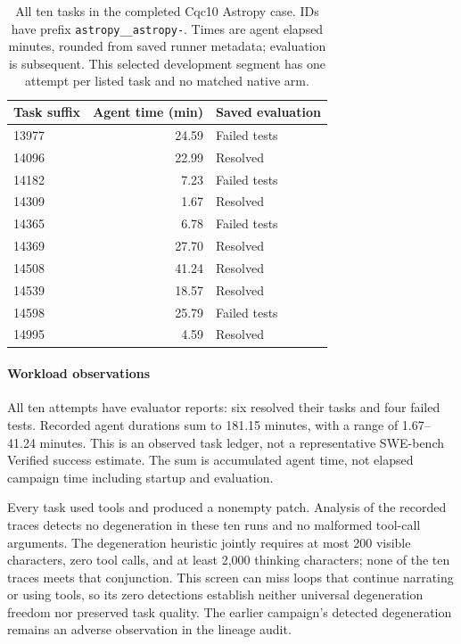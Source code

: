 \begin{table}[t]
\caption{All ten tasks in the completed Cqc10 Astropy case. IDs have prefix \texttt{astropy\_\_astropy-}. Times are agent elapsed minutes, rounded from saved runner metadata; evaluation is subsequent. This selected development segment has one attempt per listed task and no matched native arm.}
\label{tab:swe-tasks}
\centering\small
\begin{tabular}{@{}lrl@{}}
\toprule
Task suffix & Agent time (min) & Saved evaluation \\
\midrule
13977 & 24.59 & Failed tests \\
14096 & 22.99 & Resolved \\
14182 & 7.23 & Failed tests \\
14309 & 1.67 & Resolved \\
14365 & 6.78 & Failed tests \\
14369 & 27.70 & Resolved \\
14508 & 41.24 & Resolved \\
14539 & 18.57 & Resolved \\
14598 & 25.79 & Failed tests \\
14995 & 4.59 & Resolved \\
\bottomrule
\end{tabular}
\end{table}

\paragraph{Workload observations}
All ten attempts have evaluator reports: six resolved their tasks and four failed tests. Recorded agent durations sum to 181.15 minutes, with a range of 1.67--41.24 minutes. This is an observed task ledger, not a representative SWE-bench Verified success estimate. The sum is accumulated agent time, not elapsed campaign time including startup and evaluation.

Every task used tools and produced a nonempty patch. Analysis of the recorded traces detects no degeneration in these ten runs and no malformed tool-call arguments. The degeneration heuristic jointly requires at most 200 visible characters, zero tool calls, and at least 2,000 thinking characters; none of the ten traces meets that conjunction. This screen can miss loops that continue narrating or using tools, so its zero detections establish neither universal degeneration freedom nor preserved task quality. The earlier campaign's detected degeneration remains an adverse observation in the lineage audit.


